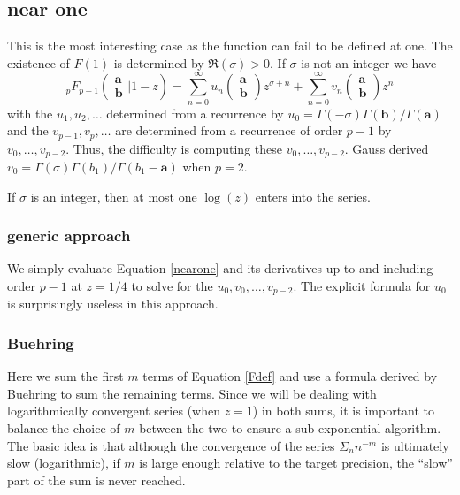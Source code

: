 \documentclass[12pt]{article}
\numberwithin{equation}{section}
\newcommand{\FF}[6] {{}_{#1}{#2}_{#3} \left( \begin{array}{c} #4 \\ #5 \end{array} \Big| {#6}  \right)}
\newcommand{\bfa}[0] {\mathbf{a}}
\begin{document}
\subsection{near one}
This is the most interesting case as the function can fail to be defined at one. The existence of $F(1)$ is determined by $\Re(\sigma)> 0$. If $\sigma$ is not an integer we have
\begin{equation}
\label{nearone}
\FF{p}{F}{p-1}{\mathbf{a}}{\mathbf{b}}{1-z} = \sum_{n=0}^{\infty} u_n \left(\begin{array}{c} \mathbf{a}\\\mathbf{b}\end{array} \right) z^{\sigma+n} + \sum_{n=0}^{\infty} v_n \left(\begin{array}{c} \mathbf{a}\\\mathbf{b}\end{array} \right) z^n
\end{equation}
with the $u_1,u_2,\dots$ determined from a recurrence by $u_0 = \Gamma(-\sigma)\Gamma(\mathbf{b})/\Gamma(\mathbf{a})$ and the $v_{p-1}, v_p, \dots$ are determined from a recurrence of order $p-1$ by $v_0, \dots, v_{p-2}$. Thus, the difficulty is computing these $v_0, \dots, v_{p-2}$. Gauss derived $v_0 = \Gamma(\sigma)\Gamma(b_1)/\Gamma(b_1-\bfa)$ when $p=2$.

If $\sigma$ is an integer, then at most one $\log(z)$ enters into the series.

\subsubsection{generic approach}
We simply evaluate Equation \eqref{nearone} and its derivatives up to and including order $p-1$ at $z=1/4$ to solve for the $u_0,v_0,\dots,v_{p-2}$. The explicit formula for $u_0$ is surprisingly useless in this approach.

\subsubsection{Buehring}
Here we sum the first $m$ terms of Equation \eqref{Fdef} and use a formula derived by Buehring to sum the remaining terms. Since we will be dealing with logarithmically convergent series (when $z=1$) in both sums, it is important to balance the choice of $m$ between the two to ensure a sub-exponential algorithm. The basic idea is that although the convergence of the series $\Sigma_n n^{-m}$ is ultimately slow (logarithmic), if $m$ is large enough relative to the target precision, the ``slow'' part of the sum is never reached.
\end{document}
